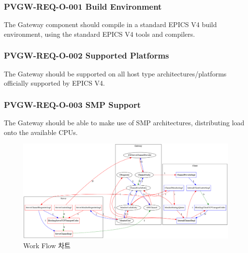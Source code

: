 \documentclass[11pt
  , a4paper
  , article
  , oneside
]{memoir}
\begin{document}
\subsubsection{PVGW-REQ-O-001 Build Environment}
The Gateway component should compile in a standard EPICS V4 build environment, using the standard EPICS V4 tools and compilers.

\subsubsection{PVGW-REQ-O-002 Supported Platforms}
The Gateway should be supported on all host type architectures/platforms officially supported by EPICS V4.

\subsubsection{PVGW-REQ-O-003 SMP Support}
The Gateway should be able to make use of SMP architectures, distributing load onto the available CPUs.


\clearpage


\begin{figure}[!htb]
	\centering
	\includegraphics[width=1\textwidth, height=0.7\textheight]{./images/work_flow.png}
	\caption{
		Work Flow 차트
	}
	\label{fig:workflow}   
\end{figure}
\end{document}
